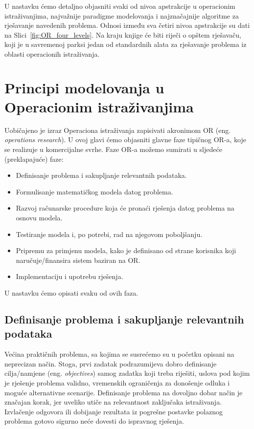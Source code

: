 \documentclass[b5paper, utf8, 11pt, colorlinks]{book}
\theoremstyle{definition}
\begin{document}
U nastavku ćemo detaljno objasniti svaki od nivoa apstrakcije u operacionim istraživanjima, najvažnije paradigme modelovanja i najznačajnije algoritme za rješavanje navedenih problema. Odnosi između sva četiri nivoa apstrakcije su dati na Slici~\ref{fig:OR_four_levels}. 
 Na kraju knjige će biti riječi o opštem rješavaču, koji je u savremenoj parksi jedan od standardnih alata za rješavanje problema iz oblasti operacionih istraživanja.
 
  
\chapter{Principi modelovanja u Operacionim istraživanjima}
Uobičajeno je izraz Operaciona istraživanja zapisivati akronimom OR (eng. \emph{operations research}). 
U ovoj glavi ćemo objasniti   glavne faze tipičnog OR-a, koje se realizuje u  komercijalne svrhe. Faze OR-a možemo sumirati u sljedeće (preklapajuće) faze: 
 \begin{itemize}
     \item Definisanje problema i sakupljanje relevantnih podataka.
     \item Formulisanje matematičkog modela datog problema.
     \item Razvoj računarske procedure koja će pronaći rješenja datog problema na osnovu modela.
     \item Testiranje modela i, po potrebi, rad na njegovom poboljšanju.
     \item Pripremu za primjenu modela, kako je definisano od strane korisnika koji naručuje/finansira sistem baziran na OR.
     \item Implementaciju i upotrebu rješenja.
 \end{itemize}
  U nastavku ćemo opisati svaku od ovih faza.
 
  \section{Definisanje problema i sakupljanje relevantnih podataka}
 
 Većina praktičnih problema, sa kojima se susrećemo  su u početku opisani na neprecizan način. Stoga, prvi zadatak podrazumijeva dobro definisanje  cilja/namjene  (eng. \emph{objectives}) samog zadatka koji treba riješiti, uslova pod kojim je rješenje problema validno,  vremenskih ograničenja za donošenje odluka i moguće alternativne scenarije.  Definisanje problema na dovoljno dobar način je značajan korak, jer uveliko utiče na relevantnost zaključaka istraživanja. Izvlačenje odgovora ili dobijanje rezultata iz pogrešne postavke polaznog problema gotovo sigurno neće dovesti do ispravnog rješenja.  
\end{document}
